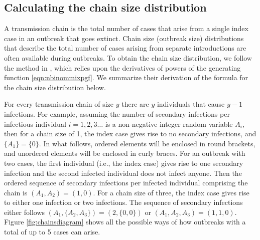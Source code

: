 \documentclass{imammb}
\numberwithin{equation}{section}
\begin{document}

\subsection{Calculating the chain size distribution}

A transmission chain is the total number of cases that arise from a single index case in an outbreak that goes extinct. Chain size (outbreak size) distributions that describe the total number of cases arising from separate introductions are often available during outbreaks.  To obtain the chain size distribution, we follow the method in \citet{Blumberg2013-xv}, which relies upon the derivatives of powers of the generating function \eqref{eqn:nbinommixpgf}. We summarize their derivation of the formula for the chain size distribution below. 


For every transmission chain of size $y$ there are $y$ individuals that cause $y-1$ infections. For example, assuming the number of secondary infections per infectious individual $i=1,2,3\dots$ is a non-negative integer random variable $A_i$, then for a chain size of 1, the index case gives rise to no secondary infections, and $\{A_1\} = \{ 0\}$. In what follows, ordered elements will be enclosed in round brackets, and unordered elements will be enclosed in curly braces. For an outbreak with two cases, the first individual (i.e., the index case) gives rise to one secondary infection and the second infected individual does not infect anyone. Then the ordered sequence of secondary infections per infected individual comprising the chain is $(A_1, A_2) = (1, 0)$. For a chain size of three, the index case gives rise to either one infection or two infections. The sequence of secondary infections either follows $(A_1,  \{A_2, A_3\}) =( 2, \{0, 0\})$ or $(A_1, A_2, A_3) = (1, 1, 0)$. Figure \ref{fig:chainsdiagram} shows all the possible ways of how outbreaks with a total of up to 5 cases can arise.  
\end{document}
